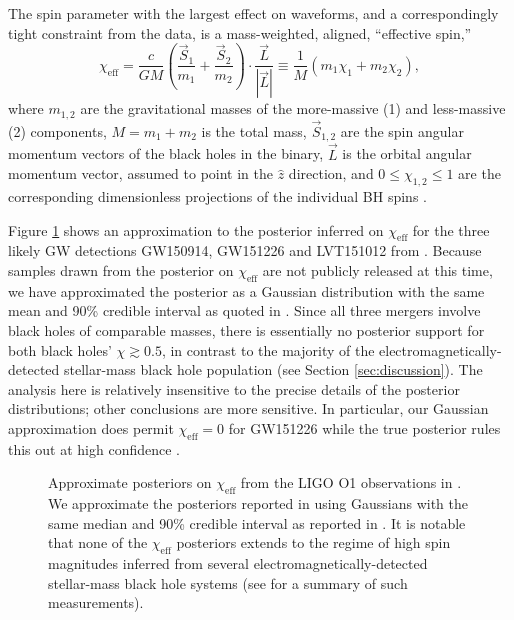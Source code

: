 \documentclass[modern,linenumbers]{aastex61}
\newcommand{\chieff}{\chi_\mathrm{eff}}
\begin{document}
The spin parameter with the largest effect on waveforms, and a
correspondingly tight constraint from the data, is a mass-weighted,
aligned, ``effective spin,''
\begin{equation}
  \chieff = \frac{c}{GM} \left( \frac{\vec{S}_1}{m_1} + \frac{\vec{S}_2}{m_2}
  \right) \cdot \frac{\vec{L}}{\left| \vec{L} \right|} \equiv \frac{1}{M} \left( m_1 \chi_1 + m_2 \chi_2 \right),
\end{equation}
where $m_{1,2}$ are the gravitational masses of the more-massive (1)
and less-massive (2) components, $M = m_1 + m_2$ is the total mass,
$\vec{S}_{1,2}$ are the spin angular momentum vectors of the black
holes in the binary, $\vec{L}$ is the orbital angular momentum vector,
assumed to point in the $\hat{z}$ direction, and
$0 \leq \chi_{1,2} \leq 1$ are the corresponding dimensionless
projections of the individual \ac{BH} spins
\citep{2016PhRvL.116x1102A}.

Figure \ref{fig:O1-posteriors} shows an approximation to the posterior
inferred on $\chieff$ for the three likely \ac{GW} detections
GW150914, GW151226 and LVT151012 from \citet{O1-BBH}.  Because samples
drawn from the posterior on $\chieff$ are not publicly released at
this time, we have approximated the posterior as a Gaussian
distribution with the same mean and 90\% credible interval as quoted
in \citet{O1-BBH}.  Since all three mergers involve black holes of
comparable masses, there is essentially no posterior support for both
black holes' $\chi \gtrsim 0.5$, in contrast to the majority of the
electromagnetically-detected stellar-mass black hole population (see
Section \ref{sec:discussion}).  The analysis here is relatively
insensitive to the precise details of the posterior distributions;
other conclusions are more sensitive.  In particular, our Gaussian
approximation does permit $\chieff = 0$ for GW151226 while the true
posterior rules this out at high confidence
\citep{2016PhRvL.116x1103A,O1-BBH}.

\begin{figure}
  \caption{\label{fig:O1-posteriors} Approximate posteriors on
    $\chieff$ from the LIGO O1 observations in \citet{O1-BBH}.  We
    approximate the posteriors reported in \citet{O1-BBH} using
    Gaussians with the same median and 90\% credible interval as
    reported in \citet{O1-BBH}.  It is notable that none of the
    $\chieff$ posteriors extends to the regime of high spin magnitudes
    inferred from several electromagnetically-detected stellar-mass
    black hole systems (see \citet{2015PhR...548....1M} for a summary
    of such measurements).}
\end{figure}
\end{document}
